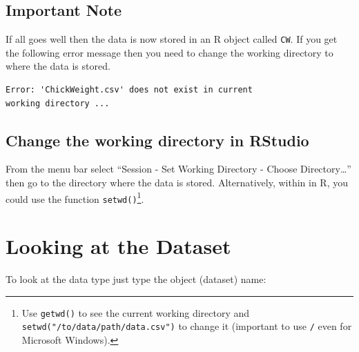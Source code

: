 \documentclass[letterpaperpaper,9pt,twocolumn,twoside,printwatermark=false]{pinp}
\begin{document}
\hypertarget{important-note}{%
\subsection{Important Note}\label{important-note}}

If all goes well then the data is now stored in an R object called
\texttt{CW}. If you get the following error message then you need to
change the working directory to where the data is stored.

\begin{verbatim}
Error: 'ChickWeight.csv' does not exist in current
working directory ...
\end{verbatim}

\hypertarget{change-the-working-directory-in-rstudio}{%
\subsection{Change the working directory in
RStudio}\label{change-the-working-directory-in-rstudio}}

From the menu bar select ``Session - Set Working Directory - Choose
Directory\ldots{}'' then go to the directory where the data is stored.
Alternatively, within in R, you could use the function
\texttt{setwd()}\footnote{Use \texttt{getwd()} to see the current
  working directory and \texttt{setwd("/to/data/path/data.csv")} to
  change it (important to use \texttt{/} even for Microsoft Windows).}.

\hypertarget{looking-at-the-dataset}{%
\section{Looking at the Dataset}\label{looking-at-the-dataset}}

To look at the data type just type the object (dataset) name:

\begin{Shaded}
\begin{Highlighting}[]
\CommentTok{#   ---                       }
\end{Highlighting}
\end{Shaded}
\end{document}
